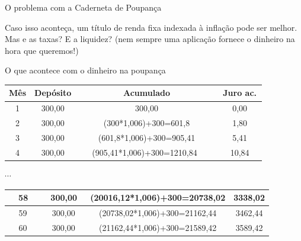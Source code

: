 \documentclass[]{beamer}
\begin{document}
\begin{frame}{O problema com a Caderneta de Poupança}


\pause

Caso isso aconteça, um título de renda fixa indexada à
inflação pode ser melhor. Mas e as taxas? E a liquidez? (nem
sempre uma aplicação fornece o dinheiro na hora que
queremos!)

\pause




\end{frame}


\begin{frame}{O que acontece com o dinheiro na poupança}

\begin{center}
\begin{tabular}{|c|c|c|c|}
\hline 
Mês & Depósito & Acumulado & Juro ac.\tabularnewline
\hline 
\hline 
1 & 300,00 & 300,00 & 0,00\tabularnewline
\hline 
2 & 300,00 & (300{*}1,006)+300=601,8 & 1,80\tabularnewline
\hline 
3 & 300,00 & (601,8{*}1,006)+300=905,41 & 5,41\tabularnewline
\hline 
4 & 300,00 & ~~~(905,41{*}1,006)+300=1210,84~~~~ & ~~10,84~~\tabularnewline
\hline 
\end{tabular}
\par\end{center}

\begin{center}
$\cdots$
\par\end{center}

\begin{center}
\begin{tabular}{|c|c|c|c|}
\hline 
~~58~ & ~~300,00~ & (20016,12{*}1,006)+300=20738,02 & 3338,02\tabularnewline
\hline 
~~59~ & ~~300,00~ & (20738,02{*}1,006)+300=21162,44 & 3462,44\tabularnewline
\hline 
~~60~ & ~~300,00~ & (21162,44{*}1,006)+300=21589,42 & 3589,42\tabularnewline
\hline 
\end{tabular}
\par\end{center}

\end{frame}
\end{document}
